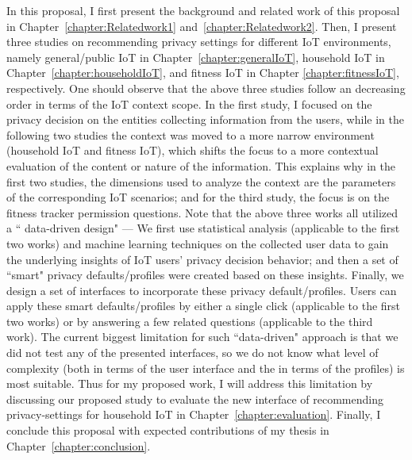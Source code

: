 In this proposal, I first present the background and related work of this proposal in Chapter~\ref{chapter:Relatedwork1} and~\ref{chapter:Relatedwork2}. Then, I present three studies on recommending privacy settings for different IoT environments, namely general/public IoT in Chapter~\ref{chapter:generalIoT}, household IoT in Chapter~\ref{chapter:householdIoT}, and fitness IoT in Chapter \ref{chapter:fitnessIoT}, respectively. One should observe that the above three studies follow an decreasing order in terms of the IoT context scope. In the first study, I focused on the privacy decision on the entities collecting information from the users, while in the following two studies the context was moved to a more narrow environment (household IoT and fitness IoT), which shifts the focus to a more contextual evaluation of the content or nature of the information. This explains why in the first two studies, the dimensions used to analyze the context are the parameters of the corresponding IoT scenarios; and for the third study, the focus is on the fitness tracker permission questions. Note that the above three works all utilized a `` data-driven design" --- We first use statistical analysis (applicable to the first two works) and machine learning techniques on the collected user data to gain the underlying insights of IoT users' privacy decision behavior; and then a set of ``smart" privacy defaults/profiles were created based on these insights. Finally, we design a set of interfaces to incorporate these privacy default/profiles. Users can apply these smart defaults/profiles by either a single click (applicable to the first two works) or by answering a few related questions (applicable to the third work). The current biggest limitation for such ``data-driven" approach is that we did not test any of the presented interfaces, so we do not know what level of complexity (both in terms of the user interface and the in terms of the profiles) is most suitable. Thus for my proposed work, I will address this limitation by discussing our proposed study to evaluate the new interface of recommending privacy-settings for household IoT in Chapter~\ref{chapter:evaluation}. Finally, I conclude this proposal with expected contributions of my thesis in Chapter~\ref{chapter:conclusion}.


